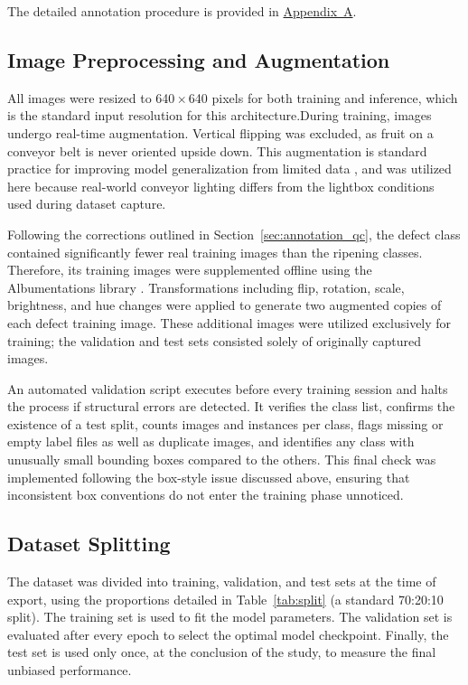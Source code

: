 The detailed annotation procedure is provided in \hyperref[app:A]{Appendix~A}.

\subsection{Image Preprocessing and Augmentation}
\label{sec:m_preprocessing}

All images were resized to 640\,$\times$\,640 pixels for both training and inference, which is the standard input resolution for this architecture.During training, images undergo real-time augmentation. Vertical flipping was excluded, as fruit on a conveyor belt is never oriented upside down. This augmentation is standard practice for improving model generalization from limited data \citep{shorten2019}, and was utilized here because real-world conveyor lighting differs from the lightbox conditions used during dataset capture.

Following the corrections outlined in Section~\ref{sec:annotation_qc}, the defect class contained significantly fewer real training images than the ripening classes. Therefore, its training images were supplemented offline using the Albumentations library \citep{buslaev2020}. Transformations including flip, rotation, scale, brightness, and hue changes were applied to generate two augmented copies of each defect training image. These additional images were utilized exclusively for training; the validation and test sets consisted solely of originally captured images.

An automated validation script executes before every training session and halts the process if structural errors are detected. It verifies the class list, confirms the existence of a test split, counts images and instances per class, flags missing or empty label files as well as duplicate images, and identifies any class with unusually small bounding boxes compared to the others. This final check was implemented following the box-style issue discussed above, ensuring that inconsistent box conventions do not enter the training phase unnoticed.

\subsection{Dataset Splitting}
\label{sec:m_splitting}

The dataset was divided into training, validation, and test sets at the time of export, using the proportions detailed in Table~\ref{tab:split} (a standard 70:20:10 split). The training set is used to fit the model parameters. The validation set is evaluated after every epoch to select the optimal model checkpoint. Finally, the test set is used only once, at the conclusion of the study, to measure the final unbiased performance.

